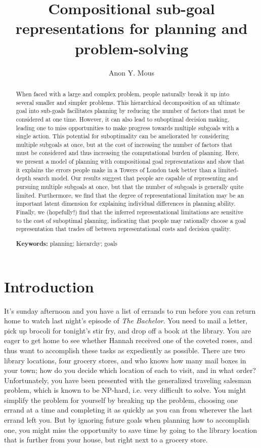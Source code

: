 \documentclass[10pt,letterpaper]{article}
\title{Compositional sub-goal representations for planning and problem-solving}
\author{Anon Y. Mous}
\begin{document}
\maketitle


\begin{abstract}
When faced with a large and complex problem, people naturally break it up into several smaller and simpler problems. This hierarchical decomposition of an ultimate goal into sub-goals facilitates planning by reducing the number of factors that must be considered at one time. However, it can also lead to suboptimal decision making, leading one to miss opportunities to make progress towards multiple subgoals with a single action. This potential for suboptimality can be ameliorated by considering multiple subgoals at once, but at the cost of increasing the number of factors that must be considered and thus increasing the computational burden of planning. Here, we present a model of planning with compositional goal representations and show that it explains the errors people make in a Towers of London task better than a limited-depth search model. Our results suggest that people are capable of representing and pursuing multiple subgoals at once, but that the number of subgoals is generally quite limited. Furthermore, we find that the degree of representational limitation may be an important latent dimension for explaining individual differences in planning ability. Finally, we (hopefully!) find that the inferred representational limitations are sensitive to the cost of suboptimal planning, indicating that people may rationally choose a goal representation that trades off between representational costs and decision quality.

\textbf{Keywords:} 
planning; hierarchy; goals
\end{abstract}


\section{Introduction}

It's sunday afternoon and you have a list of errands to run before you can return home to watch last night's episode of \textit{The Bachelor}. You need to mail a letter, pick up brocoli for tonight's stir fry, and drop off a book at the library. You are eager to get home to see whether Hannah received one of the coveted roses, and thus want to accomplish these tasks as expediently as possible. There are two library locations, four grocery stores, and who knows how many mail boxes in your town; how do you decide which location of each to visit, and in what order? Unfortunately, you have been presented with the generalized traveling salesman problem, which is known to be NP-hard, i.e. very difficult to solve. You might simplify the problem for yourself by breaking up the problem, choosing one errand at a time and completing it as quickly as you can from wherever the last errand left you. But by ignoring future goals when planning how to accomplish one, you might miss the opportunity to save time by going to the library location that is further from your house, but right next to a grocery store.
\end{document}
